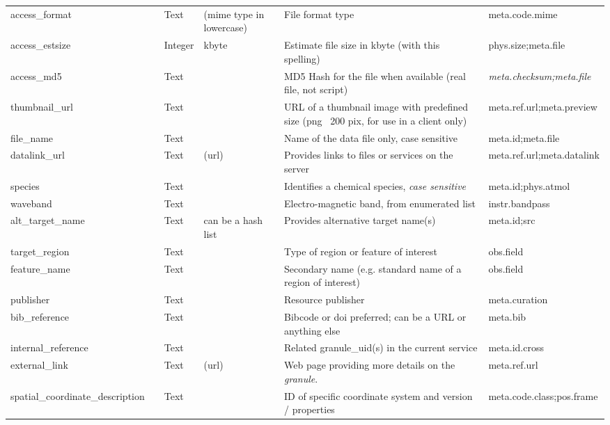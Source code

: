 \documentclass[11pt,a4paper]{ivoa}
\begin{document}
\begin{longtable}{p{3.5cm}p{0.5cm}p{1cm}p{1cm}p{7cm}p{3cm}}
access\_format&&Text&(mime type in lowercase)&File format type&meta.code.mime\\

access\_estsize&&Integer&kbyte&Estimate file size in kbyte (with this spelling)&phys.size;meta.file\\

access\_md5&&Text&&MD5 Hash for the file when available (real file, not script)&\emph{ meta.checksum;meta.file}\\

thumbnail\_url&&Text&&URL of a thumbnail image with predefined size (png ~200 pix, for use in a client only)&meta.ref.url;meta.preview\\

file\_name&&Text&&Name of the data file only, case sensitive&meta.id;meta.file\\

datalink\_url&&Text&(url)&Provides links to files or services on the server&meta.ref.url;meta.datalink\\

species&&Text&&Identifies a chemical species, \emph{case sensitive}&meta.id;phys.atmol\\

waveband&&Text&&Electro-magnetic band, from enumerated list&instr.bandpass\\

alt\_target\_name&&Text&can be a hash list&Provides alternative target name(s)&meta.id;src\\

target\_region&&Text&&Type of region or feature of interest&obs.field\\

feature\_name&&Text&&Secondary name (e.g. standard name of a region of interest)&obs.field \\

publisher&&Text&&Resource publisher&meta.curation\\

bib\_reference&&Text&&Bibcode or doi preferred; can be a URL or anything else&meta.bib\\

internal\_reference&&Text&&Related granule\_uid(s) in the current service&meta.id.cross\\

external\_link&&Text&(url)&Web page providing more details on the \emph{granule}.&meta.ref.url\\

spatial\_coordinate\_description&&Text&&ID of specific coordinate system and version / properties&meta.code.class;pos.frame\\


\end{longtable}
\end{document}

